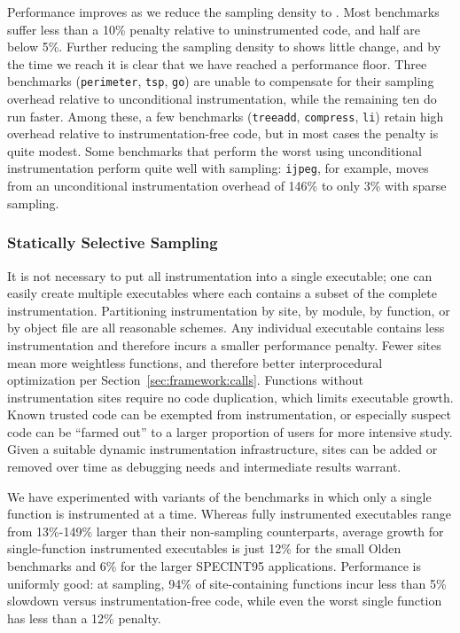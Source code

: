 Performance improves as we reduce the sampling density to
.  Most benchmarks suffer less than a 10\% penalty
relative to uninstrumented code, and half are below 5\%.  Further
reducing the sampling density to  shows little
change, and by the time we reach  it is clear
that we have reached a performance floor.  Three benchmarks
(\texttt{perimeter}, \texttt{tsp}, \texttt{go}) are unable to
compensate for their sampling overhead relative to unconditional
instrumentation, while the remaining ten do run faster.  Among these,
a few benchmarks (\texttt{treeadd}, \texttt{compress}, \texttt{li})
retain high overhead relative to instrumentation-free code, but in
most cases the penalty is quite modest.  Some benchmarks that perform
the worst using unconditional instrumentation perform quite well with
sampling: \texttt{ijpeg}, for example, moves from an unconditional
instrumentation overhead of 146\% to only 3\% with sparse sampling.

\subsubsection{Statically Selective Sampling}
\label{sec:ccured:single}

It is not necessary to put
all instrumentation into a single executable; one can easily 
create multiple executables where each contains a subset of the complete
instrumentation.  Partitioning instrumentation by site, by module, by
function, or by object file are all reasonable schemes.  Any
individual executable contains less instrumentation and therefore
incurs a smaller performance penalty.  Fewer sites mean more
weightless functions, and therefore better interprocedural
optimization per Section~\ref{sec:framework:calls}.  Functions without
instrumentation sites require no code duplication, which limits
executable growth.  Known trusted code can be exempted from
instrumentation, or especially suspect code can be ``farmed out'' to a
larger proportion of users for more intensive study.  Given a suitable
dynamic instrumentation infrastructure, sites can be added or removed
over time as debugging needs and intermediate results warrant.

\begin{sloppypar}
  We have experimented with variants of the \CCured benchmarks in
  which only a single function is instrumented at a time.  Whereas
  fully instrumented executables range from 13\%-149\% larger than
  their non-sampling counterparts, average growth for single-function
  instrumented executables is just 12\% for the small Olden benchmarks
  and 6\% for the larger SPECINT95 applications.  Performance is uniformly good:
 at  sampling,  94\% of site-containing functions incur less than 5\% slowdown
  versus instrumentation-free code, while even the worst single
  function has less than a 12\% penalty.
\end{sloppypar}

